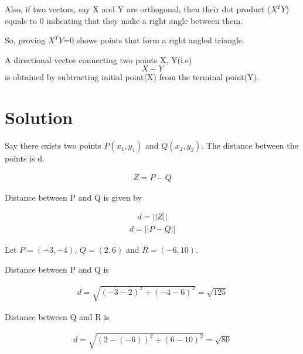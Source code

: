 \documentclass[journal,12pt,twocolumn]{IEEEtran}
\begin{document}
Also, if two vectors, say X  and Y are orthogonal, then their dot product ($X^TY$) equals to 0 indicating that they make a right angle between them. 

So, proving $X^TY$=0 shows points that form a right angled triangle. 

A directional vector connecting two points X, Y(i.e) $$X-Y$$ is obtained by subtracting initial point(X) from the terminal point(Y). 


\section{Solution}

Say there exists two points $P(x_1, y_1)$ and $Q(x_2, y_2)$. The distance between the points is d. 

\begin{align}
    Z = P - Q
\end{align}

Distance between P and Q is given by 


\begin{align}
d = ||Z||
\end{align}
\begin{align}
d = ||P-Q||
\end{align}



Let $P = (-3, -4)$, $Q = (2, 6)$ and $R = (-6, 10)$.

Distance between P and Q is 

\begin{align}
d = \sqrt{(-3-2)^2+(-4-6)^2}
=\sqrt{125}
\end{align}

Distance between Q and R is 

\begin{align}
d = \sqrt{(2-(-6))^2+(6-10)^2}
=\sqrt{80}
\end{align}
\end{document}
